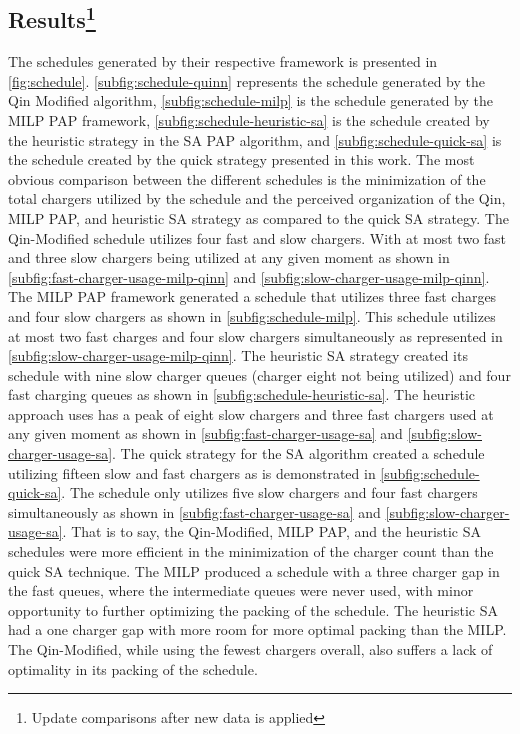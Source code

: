 \documentclass[11pt,a4paper,final]{article}
\begin{document}
\subsection{Results\footnote{Update comparisons after new data is applied}}
\label{sec:results}
The schedules generated by their respective framework is presented in \ref{fig:schedule}. \ref{subfig:schedule-quinn}
represents the schedule generated by the Qin Modified algorithm, \ref{subfig:schedule-milp} is the schedule generated by
the MILP PAP framework, \ref{subfig:schedule-heuristic-sa} is the schedule created by the heuristic strategy in the SA
PAP algorithm, and \ref{subfig:schedule-quick-sa} is the schedule created by the quick strategy presented in this work.
The most obvious comparison between the different schedules is the minimization of the total chargers utilized by the
schedule and the perceived organization of the Qin, MILP PAP, and heuristic SA strategy as compared to the quick SA
strategy. The Qin-Modified schedule utilizes four fast and slow chargers. With at most two fast and three slow chargers
being utilized at any given moment as shown in \ref{subfig:fast-charger-usage-milp-qinn} and
\ref{subfig:slow-charger-usage-milp-qinn}. The MILP PAP framework generated a schedule that utilizes three fast charges
and four slow chargers as shown in \ref{subfig:schedule-milp}. This schedule utilizes at most two fast charges and four
slow chargers simultaneously as represented in \ref{subfig:slow-charger-usage-milp-qinn}. The heuristic SA strategy
created its schedule with nine slow charger queues (charger eight not being utilized) and four fast charging queues as
shown in \ref{subfig:schedule-heuristic-sa}. The heuristic approach uses has a peak of eight slow chargers and three
fast chargers used at any given moment as shown in \ref{subfig:fast-charger-usage-sa} and
\ref{subfig:slow-charger-usage-sa}. The quick strategy for the SA algorithm created a schedule utilizing fifteen slow
and fast chargers as is demonstrated in \ref{subfig:schedule-quick-sa}. The schedule only utilizes five slow chargers
and four fast chargers simultaneously as shown in \ref{subfig:fast-charger-usage-sa} and
\ref{subfig:slow-charger-usage-sa}. That is to say, the Qin-Modified, MILP PAP, and the heuristic SA schedules were more
efficient in the minimization of the charger count than the quick SA technique. The MILP produced a schedule with a
three charger gap in the fast queues, where the intermediate queues were never used, with minor opportunity to further
optimizing the packing of the schedule. The heuristic SA had a one charger gap with more room for more optimal packing
than the MILP. The Qin-Modified, while using the fewest chargers overall, also suffers a lack of optimality in its
packing of the schedule.
\end{document}
